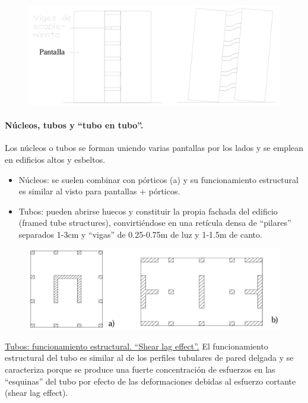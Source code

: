 \begin{figure}[H]
    \centering
    \includegraphics[width=1\linewidth]{Imagenes/Pantallas acopladas + forjados.png}
\end{figure}

\paragraph{Núcleos, tubos y ``tubo en tubo''.}
Los núcleos o tubos se forman uniendo varias pantallas por los lados y se emplean en edificios altos y esbeltos.
\begin{itemize}
    \item Núcleos: se suelen combinar con pórticos (a) y su funcionamiento estructural es similar al visto para pantallas + pórticos.
    \item Tubos: pueden abrirse huecos y constituir la propia fachada del edificio (framed tube structures), convirtiéndose en una retícula densa de ``pilares'' separados 1-3cm y ``vigas'' de 0.25-0.75m de luz y 1-1.5m de canto. 
\end{itemize}

\begin{figure}[H]
    \centering
    \includegraphics[width=1\linewidth]{Imagenes/Nucleos tubos y tubo en tubo.png}
\end{figure}

\noindent \underline{Tubos: funcionamiento estructural. ``Shear lag effect''.}
El funcionamiento estructural del tubo es similar al de los perfiles tubulares de pared delgada y se caracteriza porque se produce una fuerte concentración de esfuerzos en las ``esquinas'' del tubo por efecto de las deformaciones debidas al esfuerzo cortante (shear lag effect).


